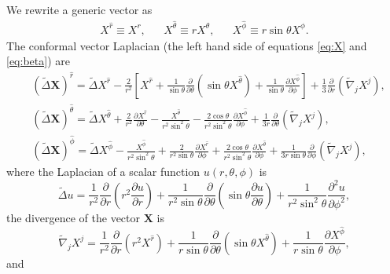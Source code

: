 We rewrite a generic vector as
\begin{align}
	&X^{\hat{r}} \equiv X^{r} ,&
	&X^{\hat{\theta}} \equiv rX^{\theta} ,&
	&X^{\hat{\phi}} \equiv r\sin\theta X^{\phi}. &
\end{align}
The conformal vector Laplacian (the left hand side of equations \eqref{eq:X} and \eqref{eq:beta}) are
\begin{align}
	&(\tilde{\Delta} \bm{X})^{\hat{r}} = \tilde{\Delta} X^{\hat{r}} 
	- \frac{2}{r^2}\left[ X^{\hat{r}} + \frac{1}{\sin\theta}\frac{\partial }{\partial \theta}\left(\sin\theta X^{\hat{\theta}}\right) + \frac{1}{\sin\theta}\frac{\partial X^{\hat{\phi}}}{\partial \phi} \right] 
	+ \frac{1}{3}\frac{\partial }{\partial r} \left( \tilde{\nabla}_j  X^j \right),  \\
	&(\tilde{\Delta} \bm{X})^{\hat{\theta}} = \tilde{\Delta} X^{\hat{\theta}} 
	+ \frac{2}{r^2}\frac{\partial X^{\hat{r}}}{\partial \theta} 
        - \frac{X^{\hat{\theta}}}{r^2\sin^2\theta} 
	- \frac{2\cos\theta}{r^2\sin^2\theta}\frac{\partial X^{\hat{\phi}}}{\partial \phi} 
        + \frac{1}{3r}\frac{\partial }{\partial \theta}\left( \tilde{\nabla}_j  X^j \right), \\
	&(\tilde{\Delta} \bm{X})^{\hat{\phi}} = \tilde{\Delta} X^{\hat{\phi}} 
	- \frac{X^{\hat{\phi}}}{r^2\sin^2\theta}
	+ \frac{2}{r^2\sin\theta}\frac{\partial X^{\hat{r}}}{\partial \phi} 
	+ \frac{2\cos\theta}{r^2\sin^2\theta}\frac{\partial X^{\hat{\theta}}}{\partial \phi} 
        + \frac{1}{3r\sin\theta}\frac{\partial }{\partial \phi}\left( \tilde{\nabla}_j  X^j \right),
\end{align}
where the Laplacian of a scalar function $u(r,\theta, \phi)$ is 
\begin{equation}
	\tilde{\Delta} u = \frac{1}{r^2}\frac{\partial}{\partial r}\left(r^2\frac{\partial u}{\partial r}\right) 
+ \frac{1}{r^2 \sin\theta}\frac{\partial }{\partial \theta} \left(\sin\theta \frac{\partial u}{\partial \theta}\right)
+ \frac{1}{r^2 \sin^2\theta}\frac{\partial^2 u }{\partial \phi^2} ,
\end{equation}
the divergence of the vector $\bm{X}$ is
\begin{equation}
	\tilde{\nabla}_j X^j = \frac{1}{r^2}\frac{\partial}{\partial r}\left(r^2 X^{\hat{r}}\right) 
	+ \frac{1}{r \sin\theta} \frac{\partial }{\partial \theta} \left(\sin\theta X^{\hat{\theta}}\right)
	+ \frac{1}{r \sin\theta} \frac{\partial X^{\hat{\phi}} }{\partial \phi}
	,
\end{equation}
and
